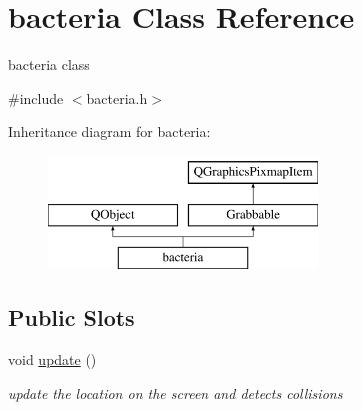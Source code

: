 \hypertarget{classbacteria}{\section{bacteria Class Reference}
\label{classbacteria}
}


bacteria class  




{\ttfamily \#include $<$bacteria.\-h$>$}

Inheritance diagram for bacteria\-:\begin{figure}[H]
\begin{center}
\leavevmode
\includegraphics[height=3.000000cm]{classbacteria}
\end{center}
\end{figure}
\subsection*{Public Slots}
\begin{DoxyCompactItemize}
\item 
void \hyperlink{classbacteria_abbc6e655d055d64b1f506248b598f03a}{update} ()
\begin{DoxyCompactList}\small\item\em update the location on the screen and detects collisions \end{DoxyCompactList}\end{DoxyCompactItemize}
